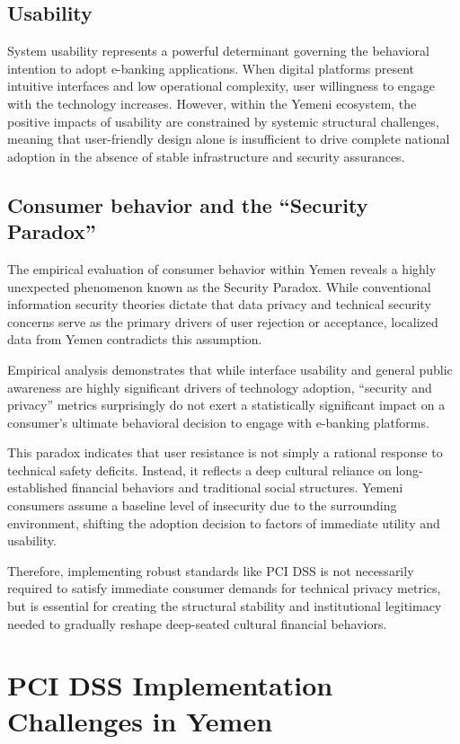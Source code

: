 \documentclass[12pt,a4paper,oneside]{report}
\begin{document}
	\subsection{Usability}
	System usability represents a powerful determinant governing the behavioral intention to adopt e-banking applications. When digital platforms present intuitive interfaces and low operational complexity, user willingness to engage with the technology increases. However, within the Yemeni ecosystem, the positive impacts of usability are constrained by systemic structural challenges, meaning that user-friendly design alone is insufficient to drive complete national adoption in the absence of stable infrastructure and security assurances.
	
	\subsection{Consumer behavior and the ``Security Paradox''}
	The empirical evaluation of consumer behavior within Yemen reveals a highly unexpected phenomenon known as the Security Paradox. While conventional information security theories dictate that data privacy and technical security concerns serve as the primary drivers of user rejection or acceptance, localized data from Yemen contradicts this assumption. 
	
	Empirical analysis demonstrates that while interface usability and general public awareness are highly significant drivers of technology adoption, ``security and privacy'' metrics surprisingly do not exert a statistically significant impact on a consumer's ultimate behavioral decision to engage with e-banking platforms.
	
	This paradox indicates that user resistance is not simply a rational response to technical safety deficits. Instead, it reflects a deep cultural reliance on long-established financial behaviors and traditional social structures. Yemeni consumers assume a baseline level of insecurity due to the surrounding environment, shifting the adoption decision to factors of immediate utility and usability. 
	
	Therefore, implementing robust standards like PCI DSS is not necessarily required to satisfy immediate consumer demands for technical privacy metrics, but is essential for creating the structural stability and institutional legitimacy needed to gradually reshape deep-seated cultural financial behaviors.
	
	\section{PCI DSS Implementation Challenges in Yemen}
	
\end{document}
